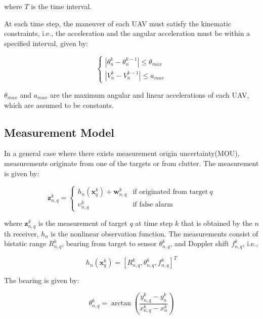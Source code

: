 \documentclass[12pt,journal,draftclsnofoot,onecolumn]{IEEEtran}
\begin{document}
where $T$ is the time interval.

At each time step, the maneuver of each UAV must satisfy the kinematic constraints, i.e., the acceleration and the angular acceleration must be within a specified interval, given by:

\begin{equation}
    \left\{
    \begin{array}{lr}
    |\theta_n^k-\theta_n^{k-1}|\leq \theta_{max}
    \\|V_n^k-V_n^{k-1}|\leq a_{max}
    \end{array}
    \right.
    \label{UAV constraints}
\end{equation}

$\theta_{max}$ and $a_{max}$ are the maximum angular and linear accelerations of each UAV, which are assumed to be constants.

\subsection{Measurement Model}
In a general case where there exists measurement origin uncertainty(MOU), measurements originate from one of the targets or from clutter. The measurement is given by:

\begin{equation}
    \mathbf{z}_{n,q}^k=\begin{cases} h_{n}(\mathbf{x}_q^k)+\mathbf{w}_{n,q}^k & \mbox{if originated from target}\ q\\ \upsilon_{n,q}^k & \mbox{if false alarm}
    	\end{cases}
    \label{measurement function}
\end{equation}

where $\mathbf{z}_{n,q}^k$ is the measurement of target $q$ at time step $k$ that is obtained by the $n$th receiver, $h_{n}$ is the nonlinear observation function. The measurements consist of bistatic range $R_{n,q}^k$, bearing from target to sensor $\theta_{n,q}^k$, and Doppler shift $f_{n,q}^k$, i.e.,

\begin{equation}
	h_{n}(\mathbf{x}_q^k)=[R_{n,q}^k, \theta_{n,q}^k, f_{n,q}^k]^T
\end{equation}

The bearing is given by:

\begin{equation}
\theta_{n,q}^k=\arctan {(\frac{{y_{n,q}^k - y_n^k}}{{x_{n,q}^k - x_n^k}})} 
\end{equation}
\end{document}
